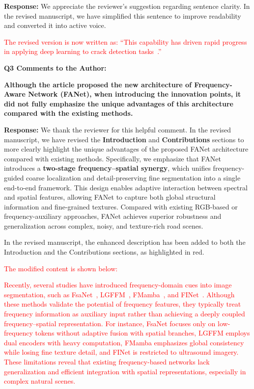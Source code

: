 \documentclass[lettersize,journal,onecolumn,12pt]{IEEEtran}
\begin{document}
\textbf{Response:}
We appreciate the reviewer’s suggestion regarding sentence clarity. 
In the revised manuscript, we have simplified this sentence to improve readability and converted it into active voice. 

\textcolor{red}{The revised version is now written as:}
\textcolor{red}{
“This capability has driven rapid progress in applying deep learning to crack detection tasks~\cite{DBLP:journals/cacie/RodriguezLozanoGPO23, DBLP:journals/cacie/ZhouZG23}.”}\\ [10pt]


\clearpage

{\color{BlueGreen} \textbf{Q3 Comments to the Author:}

\textbf{Although the article proposed the new architecture of Frequency-Aware Network (FANet), when introducing the innovation points, it did not fully emphasize the unique advantages of this architecture compared with the existing methods.}} 

\textbf{Response:}
We thank the reviewer for this helpful comment. 
In the revised manuscript, we have revised the \textbf{Introduction} and \textbf{Contributions} sections to more clearly highlight the unique advantages of the proposed FANet architecture compared with existing methods. 
Specifically, we emphasize that FANet introduces a \textbf{two-stage frequency–spatial synergy}, which unifies frequency-guided coarse localization and detail-preserving fine segmentation into a single end-to-end framework. 
This design enables adaptive interaction between spectral and spatial features, allowing FANet to capture both global structural information and fine-grained textures. 
Compared with existing RGB-based or frequency-auxiliary approaches, FANet achieves superior robustness and generalization across complex, noisy, and texture-rich road scenes. 

In the revised manuscript, the enhanced description has been added to both the Introduction and the Contributions sections, as highlighted in red. 

\textcolor{red}{The modified content is shown below:}




\textcolor{red}{
Recently, several studies have introduced frequency-domain cues into image segmentation, such as FsaNet~\cite{DBLP:journals/tip/ZhangPG23}, LGFFM~\cite{11129883TMI}, FMamba~\cite{DBLP:journals/tim/LiuLLWZS25}, and FINet~\cite{DBLP:journals/tcsv/WangZZGY25}. 
Although these methods validate the potential of frequency features, they typically treat frequency information as auxiliary input rather than achieving a deeply coupled frequency–spatial representation. 
For instance, FsaNet focuses only on low-frequency tokens without adaptive fusion with spatial branches, LGFFM employs dual encoders with heavy computation, FMamba emphasizes global consistency while losing fine texture detail, and FINet is restricted to ultrasound imagery. 
These limitations reveal that existing frequency-based networks lack generalization and efficient integration with spatial representations, especially in complex natural scenes.
}
\end{document}
